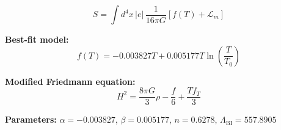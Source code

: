 
\begin{equation}
  S = \int d^4x \, |e| \, \frac{1}{16\pi G} \left[ f(T) + \mathcal{L}_m \right]
\end{equation}

\textbf{Best-fit model:}
\begin{equation}
  f(T) = -0.003827 T + 0.005177 T \ln\!\left(\frac{T}{T_0}\right)
\end{equation}

\textbf{Modified Friedmann equation:}
\begin{equation}
  H^2 = \frac{8\pi G}{3} \rho - \frac{f}{6} + \frac{T f_T}{3}
\end{equation}

\textbf{Parameters:}
$\alpha = -0.003827$, \quad
$\beta = 0.005177$, \quad
$n = 0.6278$, \quad
$\Lambda_{\text{BI}} = 557.8905$